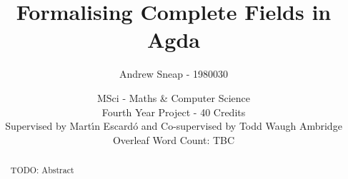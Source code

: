 \documentclass[11pt,a4paper]{article}
\title{Formalising Complete Fields in Agda}
\author{Andrew Sneap - 1980030}
\date{MSci - Maths \& Computer Science \\ Fourth Year Project - 40 Credits \\ Supervised by Mart{\'\i}n Escard\'o and Co-supervised by Todd Waugh Ambridge \\ Overleaf Word Count: TBC}
\begin{document}
\maketitle

\AgdaNoSpaceAroundCode

\begin{abstract}
    TODO: Abstract
\end{abstract}

\tableofcontents








\newpage
\printbibliography
\end{document}
